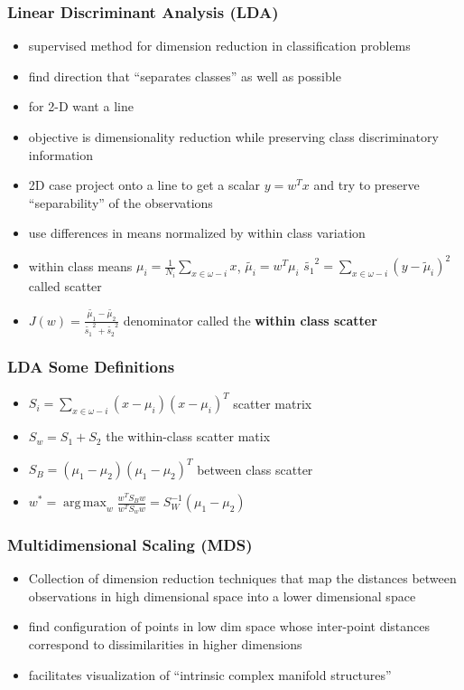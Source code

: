 \documentclass{beamer}
\DeclareMathOperator*{\argmax}{arg\,max}
\begin{document}
  \begin{frame}
    \frametitle{Linear Discriminant Analysis (LDA)}

    \begin{itemize}
    \item supervised method for dimension reduction in classification problems
    \item find direction that ``separates classes'' as well as possible
    \item for 2-D want a line
    \item objective is dimensionality reduction while preserving class discriminatory information
    \item 2D case project onto a line to get a scalar $y=w^T x$ and try to preserve ``separability'' of the observations
    \item use differences in means normalized by within class variation
    \item within class means $\mu_i=\frac{1}{N_i}\sum_{x\in \omega-i} x$, $\tilde{\mu_i}=w^T\mu_i$ ${\tilde{s_1}^2= \sum_{x\in \omega-i}(y-\tilde{\mu}_i)^2}$   called scatter
    \item $J(w)=\frac{\tilde{\mu_1}-\tilde{\mu_2}}{\tilde{s_1}^2+\tilde{s_2}^2}$  denominator called the {\bf within class scatter}
    \end{itemize}
  \end{frame}


  \begin{frame}
    \frametitle{LDA Some Definitions}
    \begin{itemize}
    \item $S_i= \sum_{x\in \omega-i} (x-\mu_i)(x-\mu_i)^T$ scatter matrix
    \item $S_w=S_1+S_2$ the within-class scatter matix
    \item $S_B=(\mu_1-\mu_2)(\mu_1-\mu_2)^T$ between class scatter
    \item $w^\ast=\argmax_w \frac{w^TS_B w}{w^TS_w w}= S^{-1}_W(\mu_1-\mu_2)$
    \end{itemize}
  \end{frame}



  \begin{frame}
    \frametitle{Multidimensional Scaling (MDS)}
    \begin{itemize}
    \item Collection of dimension reduction techniques that map the distances between observations in high dimensional space into a lower dimensional space
    \item find configuration of points in low dim space whose inter-point distances correspond to dissimilarities in higher dimensions
    \item facilitates visualization of ``intrinsic complex manifold structures''
    \end{itemize}
    \end{frame}
\end{document}
